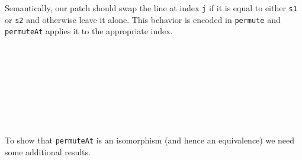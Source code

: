 Semantically, our patch should swap the line at index \texttt{j} if it is equal to either \texttt{s1}
or \texttt{s2} and otherwise leave it alone. This behavior is encoded in \texttt{permute} and \texttt{permuteAt}
applies it to the appropriate index.
\begin{code}%
\>[0]\AgdaSpace{}%
\AgdaSymbol{:}\AgdaSpace{}%
\AgdaSymbol{(}\AgdaSpace{}%
\AgdaSpace{}%
\AgdaSymbol{)}\AgdaSpace{}%
\AgdaSpace{}%
\AgdaSpace{}%
\AgdaSpace{}%
\<%
\\
\>[0]\AgdaSpace{}%
\AgdaSymbol{(}\AgdaSpace{}%
\AgdaOperator{\AgdaInductiveConstructor{,}}\AgdaSpace{}%
\AgdaSymbol{)}\AgdaSpace{}%
\AgdaSpace{}%
\AgdaSpace{}%
\AgdaSpace{}%
\AgdaSpace{}%
\AgdaSpace{}%
\AgdaSymbol{|}\AgdaSpace{}%
\AgdaSpace{}%
\AgdaSpace{}%
\<%
\\
\>[0]%
\>[23]\AgdaSymbol{|}\AgdaSpace{}%
\AgdaSpace{}%
\AgdaSymbol{\AgdaUnderscore{}}%
\>[32]\AgdaSymbol{|}\AgdaSpace{}%
\AgdaSymbol{\AgdaUnderscore{}}%
\>[40]\AgdaSymbol{=}\AgdaSpace{}%
\<%
\\
\>[0]%
\>[23]\AgdaSymbol{|}\AgdaSpace{}%
\AgdaSpace{}%
\AgdaSymbol{\AgdaUnderscore{}}%
\>[32]\AgdaSymbol{|}\AgdaSpace{}%
\AgdaSpace{}%
\AgdaSymbol{\AgdaUnderscore{}}\AgdaSpace{}%
\AgdaSymbol{=}\AgdaSpace{}%
\<%
\\
\>[0]%
\>[23]\AgdaSymbol{|}\AgdaSpace{}%
\AgdaSpace{}%
\AgdaSymbol{\AgdaUnderscore{}}%
\>[32]\AgdaSymbol{|}\AgdaSpace{}%
\AgdaSpace{}%
\AgdaSymbol{\AgdaUnderscore{}}%
\>[40]\AgdaSymbol{=}\AgdaSpace{}%
\<%
\\
%
\\[\AgdaEmptyExtraSkip]%
\>[0]\AgdaSpace{}%
\AgdaSymbol{:}\AgdaSpace{}%
\AgdaSpace{}%
\AgdaSpace{}%
\AgdaSpace{}%
\AgdaSpace{}%
\AgdaSpace{}%
\AgdaSpace{}%
\AgdaSpace{}%
\AgdaSpace{}%
\AgdaSpace{}%
\<%
\\
\>[0]\AgdaSpace{}%
\AgdaSpace{}%
\AgdaSpace{}%
\AgdaSpace{}%
\AgdaSymbol{=}\AgdaSpace{}%
\AgdaOperator{\AgdaFunction{\AgdaUnderscore{}[}}\AgdaSpace{}%
\AgdaSpace{}%
\AgdaOperator{\AgdaFunction{]\%=}}\AgdaSpace{}%
\AgdaSymbol{(}\AgdaSpace{}%
\AgdaSymbol{(}\AgdaSpace{}%
\AgdaOperator{\AgdaInductiveConstructor{,}}\AgdaSpace{}%
\AgdaSymbol{))}\<%
\end{code}
To show that \texttt{permuteAt} is an isomorphism (and hence an equivalence) we need
some additional results.

